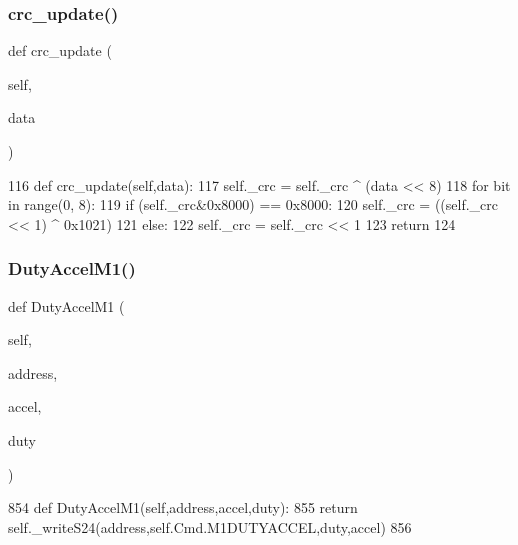 \subsubsection{\texorpdfstring{crc\+\_\+update()}{crc\_update()}}
{\footnotesize\ttfamily def crc\+\_\+update (\begin{DoxyParamCaption}\item[{}]{self,  }\item[{}]{data }\end{DoxyParamCaption})}


\begin{DoxyCode}
116     \textcolor{keyword}{def }crc\_update(self,data):
117         self.\_crc = self.\_crc ^ (data << 8)
118         \textcolor{keywordflow}{for} bit \textcolor{keywordflow}{in} range(0, 8):
119             \textcolor{keywordflow}{if} (self.\_crc&0x8000)  == 0x8000:
120                 self.\_crc = ((self.\_crc << 1) ^ 0x1021)
121             \textcolor{keywordflow}{else}:
122                 self.\_crc = self.\_crc << 1
123         \textcolor{keywordflow}{return}
124 
\end{DoxyCode}
\mbox{\label{classtoxic__hardware_1_1roboclaw__3_1_1Roboclaw_a9a743669aa5263257f5443fc24d171fe}} 
\subsubsection{\texorpdfstring{Duty\+Accel\+M1()}{DutyAccelM1()}}
{\footnotesize\ttfamily def Duty\+Accel\+M1 (\begin{DoxyParamCaption}\item[{}]{self,  }\item[{}]{address,  }\item[{}]{accel,  }\item[{}]{duty }\end{DoxyParamCaption})}


\begin{DoxyCode}
854     \textcolor{keyword}{def }DutyAccelM1(self,address,accel,duty):
855         \textcolor{keywordflow}{return} self.\_writeS24(address,self.Cmd.M1DUTYACCEL,duty,accel)
856 
\end{DoxyCode}
\mbox{\label{classtoxic__hardware_1_1roboclaw__3_1_1Roboclaw_a2aba2edd06d47a93e81ec7f3f3619f59}} 
